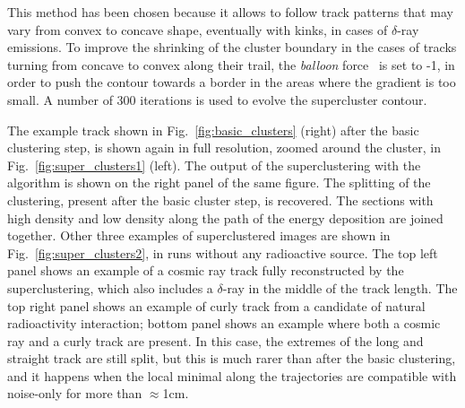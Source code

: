 This method has been chosen because it allows to follow track patterns
that may vary from convex to concave shape, eventually with kinks, \eg
in cases of $\delta$-ray emissions. To improve the shrinking of the
cluster boundary in the cases of tracks turning from concave to convex
along their trail, the \textit{balloon} force~\cite{mgac} is set to
-1, in order to push the contour towards a border in the areas where
the gradient is too small. A number of 300 iterations is used to
evolve the supercluster contour.

The example track shown in Fig.~\ref{fig:basic_clusters} (right) after
the basic clustering step, is shown again in full resolution, zoomed
around the cluster, in Fig.~\ref{fig:super_clusters1} (left). The
output of the superclustering with the \gac algorithm is shown on the
right panel of the same figure. The splitting of the clustering,
present after the basic cluster step, is recovered. The sections with
high density and low density along the path of the energy deposition
are joined together. Other three examples of superclustered images are
shown in Fig.~\ref{fig:super_clusters2}, in runs without any
radioactive source. The top left panel shows an example of a cosmic
ray track fully reconstructed by the \gac superclustering, which also
includes a $\delta$-ray in the middle of the track length. The top
right panel shows an example of curly track from a candidate of
natural radioactivity interaction; bottom panel shows an example where
both a cosmic ray and a curly track are present. In this case, the
extremes of the long and straight track are still split, but this is
much rarer than after the basic clustering, and it happens when the
local minimal along the trajectories are compatible with noise-only
for more than $\approx$1\unit{cm}.
%
